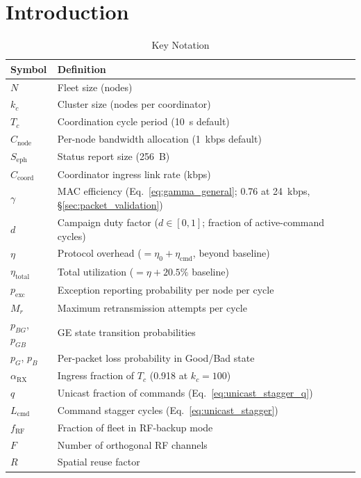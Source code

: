 \documentclass[journal]{IEEEtran}
\begin{document}
\section{Introduction}

\begin{table}[t]
    \centering
    \caption{Key Notation}
    \label{tab:notation}
    \begin{tabular}{@{}ll@{}}
        \toprule
        \textbf{Symbol} & \textbf{Definition} \\
        \midrule
        $N$ & Fleet size (nodes) \\
        $k_c$ & Cluster size (nodes per coordinator) \\
        $T_c$ & Coordination cycle period (10~s default) \\
        $C_{\text{node}}$ & Per-node bandwidth allocation (1~kbps default) \\
        $S_{\text{eph}}$ & Status report size (256~B) \\
        $C_{\text{coord}}$ & Coordinator ingress link rate (kbps) \\
        $\gamma$ & MAC efficiency (Eq.~\ref{eq:gamma_general}; 0.76 at 24~kbps, \S\ref{sec:packet_validation}) \\
        $d$ & Campaign duty factor ($d \in [0,1]$; fraction of active-command cycles) \\
        $\eta$ & Protocol overhead ($= \eta_0 + \eta_{\text{cmd}}$, beyond baseline) \\
        $\eta_{\text{total}}$ & Total utilization ($= \eta + 20.5\%$ baseline) \\
        $p_{\text{exc}}$ & Exception reporting probability per node per cycle \\
        $M_r$ & Maximum retransmission attempts per cycle \\
        $p_{BG}$, $p_{GB}$ & GE state transition probabilities \\
        $p_G$, $p_B$ & Per-packet loss probability in Good/Bad state \\
        $\alpha_{\text{RX}}$ & Ingress fraction of $T_c$ (0.918 at $k_c = 100$) \\
        $q$ & Unicast fraction of commands (Eq.~\ref{eq:unicast_stagger_q}) \\
        $L_{\text{cmd}}$ & Command stagger cycles (Eq.~\ref{eq:unicast_stagger}) \\
        $f_{\text{RF}}$ & Fraction of fleet in RF-backup mode \\
        $F$ & Number of orthogonal RF channels \\
        $R$ & Spatial reuse factor \\
        \bottomrule
    \end{tabular}
\end{table}
\end{document}
